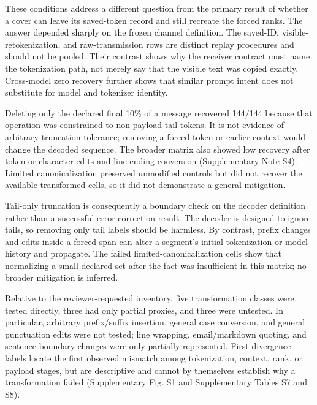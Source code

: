 \documentclass[fleqn,10pt]{wlscirep}
\begin{document}
These conditions address a different question from the primary result of whether a cover can leave its saved-token record and still recreate the forced ranks. The answer depended sharply on the frozen channel definition. The saved-ID, visible-retokenization, and raw-transmission rows are distinct replay procedures and should not be pooled. Their contrast shows why the receiver contract must name the tokenization path, not merely say that the visible text was copied exactly. Cross-model zero recovery further shows that similar prompt intent does not substitute for model and tokenizer identity.

Deleting only the declared final 10\% of a message recovered 144/144 because that operation was constrained to non-payload tail tokens. It is not evidence of arbitrary truncation tolerance; removing a forced token or earlier context would change the decoded sequence. The broader matrix also showed low recovery after token or character edits and line-ending conversion (Supplementary Note S4). Limited canonicalization preserved unmodified controls but did not recover the available transformed cells, so it did not demonstrate a general mitigation.

Tail-only truncation is consequently a boundary check on the decoder definition rather than a successful error-correction result. The decoder is designed to ignore tails, so removing only tail labels should be harmless. By contrast, prefix changes and edits inside a forced span can alter a segment's initial tokenization or model history and propagate. The failed limited-canonicalization cells show that normalizing a small declared set after the fact was insufficient in this matrix; no broader mitigation is inferred.

Relative to the reviewer-requested inventory, five transformation classes were tested directly, three had only partial proxies, and three were untested. In particular, arbitrary prefix/suffix insertion, general case conversion, and general punctuation edits were not tested; line wrapping, email/markdown quoting, and sentence-boundary changes were only partially represented. First-divergence labels locate the first observed mismatch among tokenization, context, rank, or payload stages, but are descriptive and cannot by themselves establish why a transformation failed (Supplementary Fig. S1 and Supplementary Tables S7 and S8).
\end{document}
